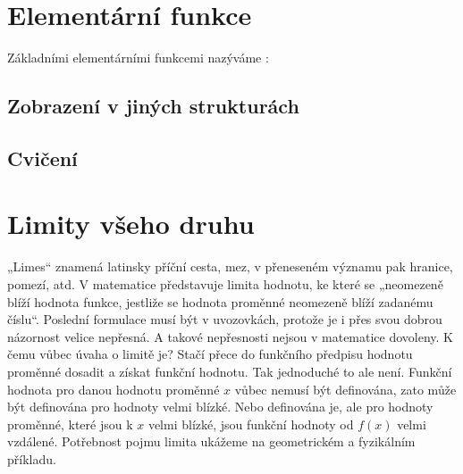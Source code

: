 {  \section{Elementární funkce}
      Základními elementárními funkcemi nazýváme \cite[s.~10]{PolakMA1}:
     
    \subsection{Zobrazení v jiných strukturách}
    \subsection{Cvičení}
  \section{Limity všeho druhu}  
    „Limes“ znamená latinsky příční cesta, mez, v přeneseném významu pak hranice, pomezí, atd. V 
    matematice představuje limita hodnotu, ke které se „neomezeně blíží hodnota funkce, jestliže se 
    hodnota proměnné neomezeně blíží zadanému číslu“. Poslední formulace musí být v uvozovkách, 
    protože je i přes svou dobrou názornost velice nepřesná. A takové nepřesnosti nejsou v 
    matematice dovoleny. K čemu vůbec úvaha o limitě je? Stačí přece do funkčního předpisu hodnotu 
    proměnné dosadit a získat funkční hodnotu. Tak jednoduché to ale není. Funkční hodnota pro 
    danou hodnotu proměnné \(x\) vůbec nemusí být definována, zato může být definována pro hodnoty 
    velmi blízké. Nebo definována je, ale pro hodnoty proměnné, které jsou k \(x\) velmi blízké, 
    jsou funkční hodnoty od \(f(x)\) velmi vzdálené. Potřebnost pojmu limita ukážeme na 
    geometrickém a fyzikálním příkladu.
    
}
